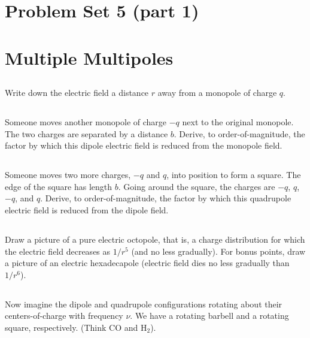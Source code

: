 \documentclass[11pt]{article}
\begin{document}
\pagestyle{empty}
\parindent=0pt

\section*{\centering Problem Set 5 (part 1)}

\section{Multiple Multipoles}

\subsection{}
Write down the electric field a distance $r$ away from a monopole of charge $q$.


\subsection{}
Someone moves another monopole of charge $−q$ next to the original monopole.
The two charges are separated by a distance $b$. Derive, to order-of-magnitude,
the factor by which this dipole electric field is reduced from the monopole
field.

\subsection{}
Someone moves two more charges, $−q$ and $q$, into position to
form a square.  The edge of the square has length $b$. Going around the square,
the charges are $−q$, $q$, $−q$, and $q$. Derive, to order-of-magnitude, the
factor by which this quadrupole electric field is reduced from the dipole
field.

\subsection{}
Draw a picture of a pure electric octopole, that is, a charge distribution
for which the electric field decreases as $1/r^5$ (and no less gradually). For
bonus points, draw a picture of an electric hexadecapole (electric field dies
no less gradually than $1/r^6$).

\subsection{}
Now imagine the dipole and quadrupole configurations 
rotating about their centers-of-charge with frequency $\nu$. We have a rotating
barbell and a rotating square, respectively. (Think CO and H$_2$).
\end{document}
